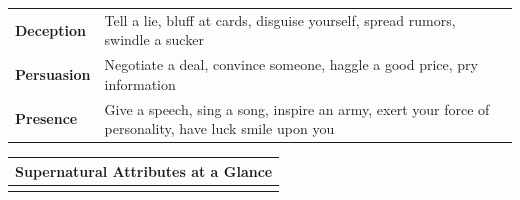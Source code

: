 \documentclass[12pt]{report}
\begin{document}
\begin{longtable}[c]{@{}ll@{}}
\toprule
\begin{minipage}[t]{0.03\columnwidth}\raggedright\strut
\textbf{Deception}
\strut\end{minipage} &
\begin{minipage}[t]{0.03\columnwidth}\raggedright\strut
Tell a lie, bluff at cards, disguise yourself, spread rumors, swindle a
sucker
\strut\end{minipage}\tabularnewline
\begin{minipage}[t]{0.03\columnwidth}\raggedright\strut
\textbf{Persuasion}
\strut\end{minipage} &
\begin{minipage}[t]{0.03\columnwidth}\raggedright\strut
Negotiate a deal, convince someone, haggle a good price, pry information
\strut\end{minipage}\tabularnewline
\begin{minipage}[t]{0.03\columnwidth}\raggedright\strut
\textbf{Presence}
\strut\end{minipage} &
\begin{minipage}[t]{0.03\columnwidth}\raggedright\strut
Give a speech, sing a song, inspire an army, exert your force of
personality, have luck smile upon you
\strut\end{minipage}\tabularnewline
\bottomrule
\end{longtable}

\begin{longtable}[c]{@{}l@{}}
\toprule
Supernatural Attributes at a Glance\tabularnewline
\midrule
\endhead
\tabularnewline
\bottomrule
\end{longtable}
\end{document}
